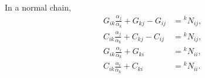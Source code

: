 In a normal chain,
\begin{align*}
G_{ik} \frac{\alpha_j}{\alpha_k} + G_{kj} - G_{ij} &= {}^kN_{ij}, \\
C_{ik} \frac{\alpha_j}{\alpha_k} + C_{kj} - C_{ij} &= {}^kN_{ij}, \\
G_{ik} \frac{\alpha_i}{\alpha_k} + G_{ki} &= {}^kN_{ii}, \\
C_{ik} \frac{\alpha_i}{\alpha_k} + C_{ki} &= {}^kN_{ii}.
\end{align*}
